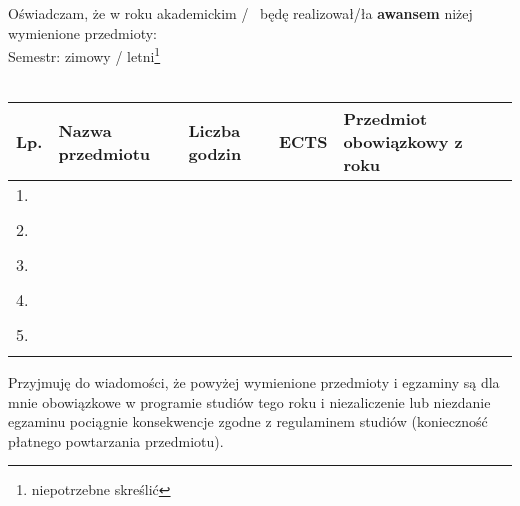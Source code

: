 \documentclass{wmiisubmission}
\begin{document}
\cracowdate
{}
\studentaddress
\addressee{\piotrniemiec}

\vskip 1.6cm

Oświadczam, że w roku akademickim \fillField{1.2cm}/\fillField{1.2cm}~ będę realizował/ła
\textbf{awansem} niżej
wymienione przedmioty:\\

Semestr: zimowy / letni\footnote[1]{niepotrzebne skreślić}\\\\

\begin{tabularx}{\textwidth}{|l|X|l|l|l|}

    \hline
    \textbf{Lp.} & \textbf{Nazwa przedmiotu} \hspace{0.9cm} & \small{\textbf{Liczba godzin}} & \textbf{ECTS} & \footnotesize{\textbf{Przedmiot obowiązkowy z roku}} \\
    \hline
    1.  &   &   &  &\\
        &   &   &  &\\
    \hline
    2.  &   &   &  &\\
        &   &   &  &\\
    \hline
    3.  &   &   &  &\\
        &   &   &  &\\
    \hline
    4.  &   &   &  &\\
        &   &   &  &\\
    \hline
    5.  &   &   &  &\\
        &   &   &  &\\
    \hline

\end{tabularx}

\vskip 1.4cm

Przyjmuję do wiadomości, że powyżej wymienione przedmioty i egzaminy są dla mnie
obowiązkowe w programie studiów tego roku i niezaliczenie lub niezdanie egzaminu
pociągnie konsekwencje zgodne z regulaminem studiów (konieczność płatnego
powtarzania przedmiotu).

\vskip 1.6cm

\studentsignature

\vskip 1.5cm

\end{document}
